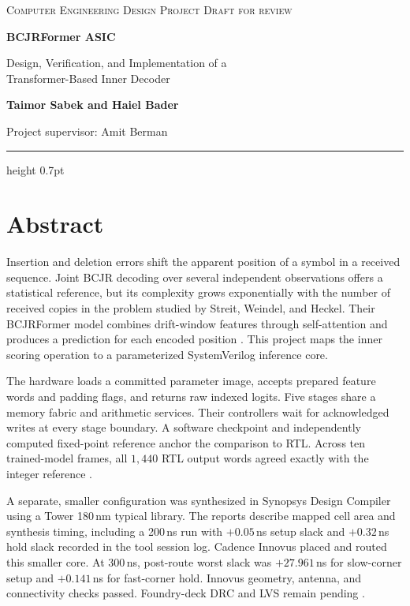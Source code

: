 \thispagestyle{fancy}
\vspace*{13mm}
{\color{DeepTeal}\large\textsc{Computer Engineering Design Project} \hfill \textsc{Draft for review}}\par
\vspace{4mm}
{\color{Ink}\fontsize{31}{35}\selectfont\bfseries BCJRFormer ASIC\par}
\vspace{2mm}
{\color{Fog}\Large Design, Verification, and Implementation of a\\[2pt]
Transformer-Based Inner Decoder\par}
\vspace{6mm}
{\large\bfseries Taimor Sabek and Haiel Bader}\par
{\color{Fog}Project supervisor: Amit Berman}\par
\vspace{4mm}
{\color{Rule}\hrule height 0.7pt}
\vspace{5mm}

\section*{Abstract}
Insertion and deletion errors shift the apparent position of a symbol in a received sequence. Joint BCJR decoding over several independent observations offers a statistical reference, but its complexity grows exponentially with the number of received copies in the problem studied by Streit, Weindel, and Heckel. Their BCJRFormer model combines drift-window features through self-attention and produces a prediction for each encoded position \cite{streit}. This project maps the inner scoring operation to a parameterized SystemVerilog inference core.

The hardware loads a committed parameter image, accepts prepared feature words and padding flags, and returns raw indexed logits. Five stages share a memory fabric and arithmetic services. Their controllers wait for acknowledged writes at every stage boundary. A software checkpoint and independently computed fixed-point reference anchor the comparison to RTL. Across ten trained-model frames, all \(1{,}440\) RTL output words agreed exactly with the integer reference \cite{backend}.

A separate, smaller configuration was synthesized in Synopsys Design Compiler using a Tower 180\,nm typical library. The reports describe mapped cell area and synthesis timing, including a 200\,ns run with \(+0.05\)\,ns setup slack and \(+0.32\)\,ns hold slack recorded in the tool session log. Cadence Innovus placed and routed this smaller core. At 300\,ns, post-route worst slack was \(+27.961\)\,ns for slow-corner setup and \(+0.141\)\,ns for fast-corner hold. Innovus geometry, antenna, and connectivity checks passed. Foundry-deck DRC and LVS remain pending \cite{backend}.

